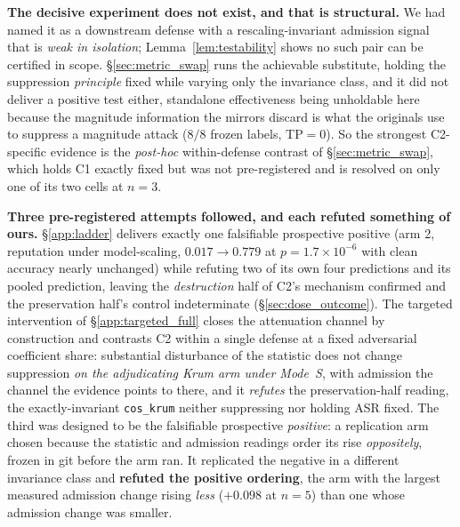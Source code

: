 \documentclass{article}
\begin{document}
\noindent \textbf{The decisive experiment does not exist, and that is structural.} We had named it as a downstream defense with a rescaling-invariant admission signal that is \emph{weak in isolation}; Lemma~\ref{lem:testability} shows no such pair can be certified in scope. §\ref{sec:metric_swap} runs the achievable substitute, holding the suppression \emph{principle} fixed while varying only the invariance class, and it did not deliver a positive test either, standalone effectiveness being unholdable here because the magnitude information the mirrors discard is what the originals use to suppress a magnitude attack ($8/8$ frozen labels, TP${}=0$). So the strongest C2-specific evidence is the \emph{post-hoc} within-defense contrast of §\ref{sec:metric_swap}, which holds C1 exactly fixed but was not pre-registered and is resolved on only one of its two cells at $n{=}3$.

\noindent \textbf{Three pre-registered attempts followed, and each refuted something of ours.} §\ref{app:ladder} delivers exactly one falsifiable prospective positive (arm 2, reputation under model-scaling, $0.017 \to 0.779$ at $p = 1.7\times10^{-6}$ with clean accuracy nearly unchanged) while refuting two of its own four predictions and its pooled prediction, leaving the \emph{destruction} half of C2's mechanism confirmed and the preservation half's control indeterminate (§\ref{sec:dose_outcome}). The targeted intervention of §\ref{app:targeted_full} closes the attenuation channel by construction and contrasts C2 within a single defense at a fixed adversarial coefficient share: substantial disturbance of the statistic does not change suppression \emph{on the adjudicating Krum arm under Mode~S}, with admission the channel the evidence points to there, and it \emph{refutes} the preservation-half reading, the exactly-invariant \texttt{cos\_krum} neither suppressing nor holding ASR fixed. The third was designed to be the falsifiable prospective \emph{positive}: a replication arm chosen because the statistic and admission readings order its rise \emph{oppositely}, frozen in git before the arm ran. It replicated the negative in a different invariance class and \textbf{refuted the positive ordering}, the arm with the largest measured admission change rising \emph{less} ($+0.098$ at $n{=}5$) than one whose admission change was smaller.
\end{document}
